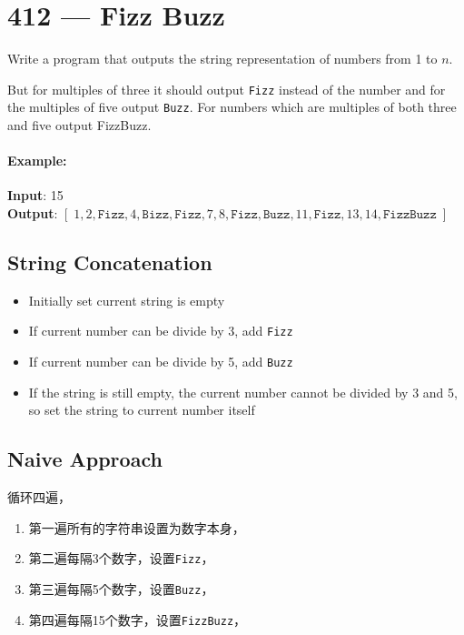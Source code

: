 \section{412 --- Fizz Buzz}
Write a program that outputs the string representation of numbers from 1 to $ n $.
\par
But for multiples of three it should output \texttt{Fizz} instead of the number and for the multiples of five output \texttt{Buzz}. For numbers which are multiples of both three and five output FizzBuzz.

\paragraph{Example:}
\begin{flushleft}
\textbf{Input}: 15
\\
\textbf{Output}: $[\;1,2,\texttt{Fizz}, 4, \texttt{Bizz}, \texttt{Fizz}, 7, 8, \texttt{Fizz}, \texttt{Buzz}, 11, \texttt{Fizz}, 13, 14, \texttt{FizzBuzz}\;]$
\end{flushleft}

\subsection{String Concatenation}
\begin{itemize}
\item Initially set current string is empty
\item If current number can be divide by 3, add \texttt{Fizz}
\item If current number can be divide by 5, add \texttt{Buzz}
\item If the string is still empty, the current number cannot be divided by 3 and 5, so set the string to current number itself
\end{itemize}

\subsection{Naive Approach}
循环四遍，
\begin{enumerate}
\item 第一遍所有的字符串设置为数字本身，
\item 第二遍每隔3个数字，设置\texttt{Fizz}，
\item 第三遍每隔5个数字，设置\texttt{Buzz}，
\item 第四遍每隔15个数字，设置\texttt{FizzBuzz}，
\end{enumerate}

